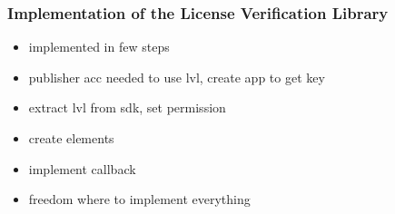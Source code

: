\subsubsection{Implementation of the License Verification Library} \label{section:license-google-implementation}
\begin{itemize}
  \item implemented in few steps
  \item publisher acc needed to use lvl, create app to get key
  \item extract lvl from sdk, set permission
  \item create elements
  \item implement callback
  \item freedom where to implement everything
\end{itemize}
